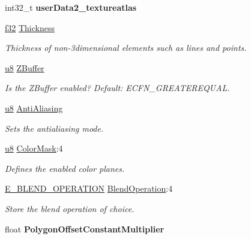 \begin{DoxyCompactItemize}
\item 
int32\+\_\+t {\bfseries user\+Data2\+\_\+textureatlas}\hypertarget{classirr_1_1video_1_1SMaterial_ae4d6b7d60515be16e3fb7b0ffc02d3a9}{}\label{classirr_1_1video_1_1SMaterial_ae4d6b7d60515be16e3fb7b0ffc02d3a9}

\item 
\hyperlink{namespaceirr_a0277be98d67dc26ff93b1a6a1d086b07}{f32} \hyperlink{classirr_1_1video_1_1SMaterial_a5b147b8e6fa53c54d3f33e44982220a1}{Thickness}\hypertarget{classirr_1_1video_1_1SMaterial_a5b147b8e6fa53c54d3f33e44982220a1}{}\label{classirr_1_1video_1_1SMaterial_a5b147b8e6fa53c54d3f33e44982220a1}

\begin{DoxyCompactList}\small\item\em Thickness of non-\/3dimensional elements such as lines and points. \end{DoxyCompactList}\item 
\hyperlink{namespaceirr_a646874f69af8ff87fc10201b0254a761}{u8} \hyperlink{classirr_1_1video_1_1SMaterial_a7e604773b2ac61ab7a15ec9afef0dabf}{Z\+Buffer}
\begin{DoxyCompactList}\small\item\em Is the Z\+Buffer enabled? Default\+: E\+C\+F\+N\+\_\+\+G\+R\+E\+A\+T\+E\+R\+E\+Q\+U\+AL. \end{DoxyCompactList}\item 
\hyperlink{namespaceirr_a646874f69af8ff87fc10201b0254a761}{u8} \hyperlink{classirr_1_1video_1_1SMaterial_a8f42b43ebf214c502e6758b9b608c095}{Anti\+Aliasing}
\begin{DoxyCompactList}\small\item\em Sets the antialiasing mode. \end{DoxyCompactList}\item 
\hyperlink{namespaceirr_a646874f69af8ff87fc10201b0254a761}{u8} \hyperlink{classirr_1_1video_1_1SMaterial_a5a4833b515b453c592224d89356dbc01}{Color\+Mask}\+:4
\begin{DoxyCompactList}\small\item\em Defines the enabled color planes. \end{DoxyCompactList}\item 
\hyperlink{namespaceirr_1_1video_a6d78c1faed23a03e8ef7b7b623bbaf2f}{E\+\_\+\+B\+L\+E\+N\+D\+\_\+\+O\+P\+E\+R\+A\+T\+I\+ON} \hyperlink{classirr_1_1video_1_1SMaterial_afbef5b333fd3af57649cf11ab575fa26}{Blend\+Operation}\+:4
\begin{DoxyCompactList}\small\item\em Store the blend operation of choice. \end{DoxyCompactList}\item 
float {\bfseries Polygon\+Offset\+Constant\+Multiplier}\hypertarget{classirr_1_1video_1_1SMaterial_a2ecdbe77e231bf67468faff995000e32}{}\label{classirr_1_1video_1_1SMaterial_a2ecdbe77e231bf67468faff995000e32}


\end{DoxyCompactItemize}
